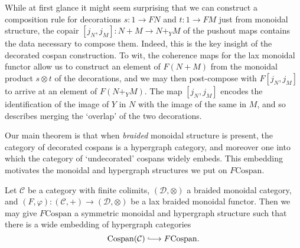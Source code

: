 \begin{remark}
While at first glance it might seem surprising that we can construct a
composition rule for decorations $s\colon  1\to FN$ and $t\colon  1 \to FM$ just from
monoidal structure, the copair $[j_N,j_M]\colon  N+M \to N+_YM$ of the pushout maps
contains the data necessary to compose them. Indeed, this is the key insight of the
decorated cospan construction. To wit, the coherence maps for the lax monoidal
functor allow us to construct an element of $F(N+M)$ from the monoidal product
$s \otimes t$ of the decorations, and we may then post-compose with $F[j_N,j_M]$ to
arrive at an element of $F(N+_YM)$. The map $[j_N,j_M]$ encodes the
identification of the image of $Y$ in $N$ with the image of the same in $M$, and
so describes merging the `overlap' of the two decorations.
\end{remark}

Our main theorem is that when \emph{braided} monoidal structure is present, the
category of decorated cospans is a hypergraph category, and moreover one into
which the category of `undecorated' cospans widely embeds.  This embedding
motivates the monoidal and hypergraph structures we put on $F\mathrm{Cospan}$.

\begin{theorem} \label{thm:fcospans}
  Let $\mathcal C$ be a category with finite colimits, $(\mathcal D, \otimes)$ a
  braided monoidal category, and $(F,\varphi)\colon  (\mathcal C,+) \to (\mathcal D,
  \otimes)$ be a lax braided monoidal functor. Then we may give
  $F\mathrm{Cospan}$ a symmetric monoidal and hypergraph structure such that
  there is a wide embedding of hypergraph categories
  \[
    \mathrm{Cospan(\mathcal C)} \hooklongrightarrow F\mathrm{Cospan}.
  \]
\end{theorem}

